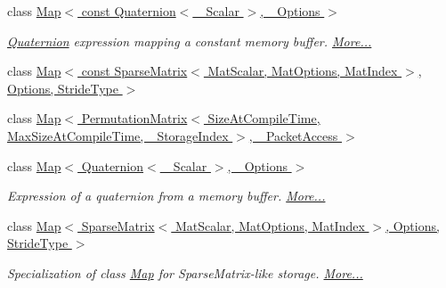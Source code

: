 \begin{DoxyCompactItemize}
class \hyperlink{group___geometry___module_class_eigen_1_1_map_3_01const_01_quaternion_3_01___scalar_01_4_00_01___options_01_4}{Map$<$ const Quaternion$<$ \+\_\+\+Scalar $>$, \+\_\+\+Options $>$}
\begin{DoxyCompactList}\small\item\em \hyperlink{group___geometry___module_class_eigen_1_1_quaternion}{Quaternion} expression mapping a constant memory buffer.  \hyperlink{group___geometry___module_class_eigen_1_1_map_3_01const_01_quaternion_3_01___scalar_01_4_00_01___options_01_4}{More...}\end{DoxyCompactList}\item 
class \hyperlink{class_eigen_1_1_map_3_01const_01_sparse_matrix_3_01_mat_scalar_00_01_mat_options_00_01_mat_index4032bba20cf92aab8bcf07e926e15a4f}{Map$<$ const Sparse\+Matrix$<$ Mat\+Scalar, Mat\+Options, Mat\+Index $>$, Options, Stride\+Type $>$}
\item 
class \hyperlink{class_eigen_1_1_map_3_01_permutation_matrix_3_01_size_at_compile_time_00_01_max_size_at_compile_2f9d18bf0084dbfb13fbbfe14adaf22d}{Map$<$ Permutation\+Matrix$<$ Size\+At\+Compile\+Time, Max\+Size\+At\+Compile\+Time, \+\_\+\+Storage\+Index $>$, \+\_\+\+Packet\+Access $>$}
\item 
class \hyperlink{group___geometry___module_class_eigen_1_1_map_3_01_quaternion_3_01___scalar_01_4_00_01___options_01_4}{Map$<$ Quaternion$<$ \+\_\+\+Scalar $>$, \+\_\+\+Options $>$}
\begin{DoxyCompactList}\small\item\em Expression of a quaternion from a memory buffer.  \hyperlink{group___geometry___module_class_eigen_1_1_map_3_01_quaternion_3_01___scalar_01_4_00_01___options_01_4}{More...}\end{DoxyCompactList}\item 
class \hyperlink{group___sparse_core___module_class_eigen_1_1_map_3_01_sparse_matrix_3_01_mat_scalar_00_01_mat_options_00_01_mat_index_01_4_002c859b470cc9e43a031929bd752a93e6}{Map$<$ Sparse\+Matrix$<$ Mat\+Scalar, Mat\+Options, Mat\+Index $>$, Options, Stride\+Type $>$}
\begin{DoxyCompactList}\small\item\em Specialization of class \hyperlink{group___core___module_class_eigen_1_1_map}{Map} for Sparse\+Matrix-\/like storage.  \hyperlink{group___sparse_core___module_class_eigen_1_1_map_3_01_sparse_matrix_3_01_mat_scalar_00_01_mat_options_00_01_mat_index_01_4_002c859b470cc9e43a031929bd752a93e6}{More...}\end{DoxyCompactList}\item 

\end{DoxyCompactItemize}
